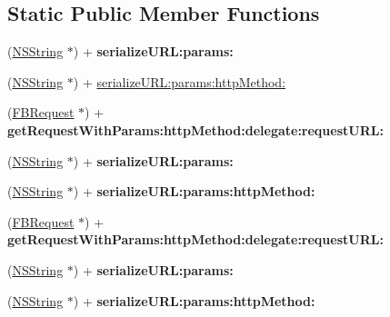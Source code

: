 \subsection*{\-Static \-Public \-Member \-Functions}
\begin{DoxyCompactItemize}
\item 
\hypertarget{interface_f_b_request_a4756734db903cd186733d84a1bb6fe7b}{
(\hyperlink{class_n_s_string}{\-N\-S\-String} $\ast$) + {\bfseries serialize\-U\-R\-L\-:params\-:}}
\label{interface_f_b_request_a4756734db903cd186733d84a1bb6fe7b}

\item 
(\hyperlink{class_n_s_string}{\-N\-S\-String} $\ast$) + \hyperlink{interface_f_b_request_a60fa7c3948528ec78fd1b9aada817e63}{serialize\-U\-R\-L\-:params\-:http\-Method\-:}
\item 
\hypertarget{interface_f_b_request_a1e3096cbc8ad4535efed9e118bd441a2}{
(\hyperlink{interface_f_b_request}{\-F\-B\-Request} $\ast$) + {\bfseries get\-Request\-With\-Params\-:http\-Method\-:delegate\-:request\-U\-R\-L\-:}}
\label{interface_f_b_request_a1e3096cbc8ad4535efed9e118bd441a2}

\item 
\hypertarget{interface_f_b_request_aee7086d7ad0b6187567f27e50e5200f4}{
(\hyperlink{class_n_s_string}{\-N\-S\-String} $\ast$) + {\bfseries serialize\-U\-R\-L\-:params\-:}}
\label{interface_f_b_request_aee7086d7ad0b6187567f27e50e5200f4}

\item 
\hypertarget{interface_f_b_request_a4d464c3f3ee693fd58765836ac711dcd}{
(\hyperlink{class_n_s_string}{\-N\-S\-String} $\ast$) + {\bfseries serialize\-U\-R\-L\-:params\-:http\-Method\-:}}
\label{interface_f_b_request_a4d464c3f3ee693fd58765836ac711dcd}

\item 
\hypertarget{interface_f_b_request_ad72a5d444c91c0d8360b14c50ea050c4}{
(\hyperlink{interface_f_b_request}{\-F\-B\-Request} $\ast$) + {\bfseries get\-Request\-With\-Params\-:http\-Method\-:delegate\-:request\-U\-R\-L\-:}}
\label{interface_f_b_request_ad72a5d444c91c0d8360b14c50ea050c4}

\item 
\hypertarget{interface_f_b_request_aee7086d7ad0b6187567f27e50e5200f4}{
(\hyperlink{class_n_s_string}{\-N\-S\-String} $\ast$) + {\bfseries serialize\-U\-R\-L\-:params\-:}}
\label{interface_f_b_request_aee7086d7ad0b6187567f27e50e5200f4}

\item 
\hypertarget{interface_f_b_request_a4d464c3f3ee693fd58765836ac711dcd}{
(\hyperlink{class_n_s_string}{\-N\-S\-String} $\ast$) + {\bfseries serialize\-U\-R\-L\-:params\-:http\-Method\-:}}
\label{interface_f_b_request_a4d464c3f3ee693fd58765836ac711dcd}


\end{DoxyCompactItemize}
